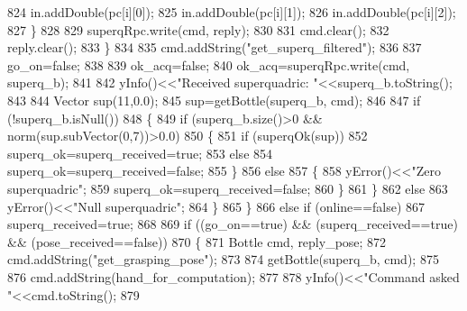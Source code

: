\begin{DoxyCode}
824                         in.addDouble(pc[i][0]);
825                         in.addDouble(pc[i][1]);
826                         in.addDouble(pc[i][2]);                        
827                     \}
828 
829                     superqRpc.write(cmd, reply);
830 
831                     cmd.clear();
832                     reply.clear();
833                 \}
834 
835                 cmd.addString(\textcolor{stringliteral}{"get\_superq\_filtered"});
836 
837                 go\_on=\textcolor{keyword}{false};
838 
839                 ok\_acq=\textcolor{keyword}{false};
840                 ok\_acq=superqRpc.write(cmd, superq\_b);
841 
842                 yInfo()<<\textcolor{stringliteral}{"Received superquadric: "}<<superq\_b.toString();
843 
844                 Vector sup(11,0.0);
845                 sup=getBottle(superq\_b, cmd);
846                
847                 \textcolor{keywordflow}{if} (!superq\_b.isNull())
848                 \{
849                     \textcolor{keywordflow}{if} (superq\_b.size()>0 && norm(sup.subVector(0,7))>0.0)
850                    \{
851                         \textcolor{keywordflow}{if} (superqOk(sup))
852                             superq\_ok=superq\_received=\textcolor{keyword}{true};
853                         \textcolor{keywordflow}{else}
854                             superq\_ok=superq\_received=\textcolor{keyword}{false};
855                     \}
856                     \textcolor{keywordflow}{else}
857                     \{
858                         yError()<<\textcolor{stringliteral}{"Zero superquadric"};
859                         superq\_ok=superq\_received=\textcolor{keyword}{false};                       
860                     \}
861                 \}
862                 \textcolor{keywordflow}{else}
863                     yError()<<\textcolor{stringliteral}{"Null superquadric"};
864             \}
865         \}
866         \textcolor{keywordflow}{else} \textcolor{keywordflow}{if} (online==\textcolor{keyword}{false})
867             superq\_received=\textcolor{keyword}{true};
868 
869         \textcolor{keywordflow}{if} ((go\_on==\textcolor{keyword}{true}) && (superq\_received==\textcolor{keyword}{true}) && (pose\_received==\textcolor{keyword}{false}))
870         \{
871             Bottle cmd, reply\_pose;
872             cmd.addString(\textcolor{stringliteral}{"get\_grasping\_pose"});
873 
874             getBottle(superq\_b, cmd);
875 
876             cmd.addString(hand\_for\_computation);
877 
878             yInfo()<<\textcolor{stringliteral}{"Command asked "}<<cmd.toString();
879 

\end{DoxyCode}
